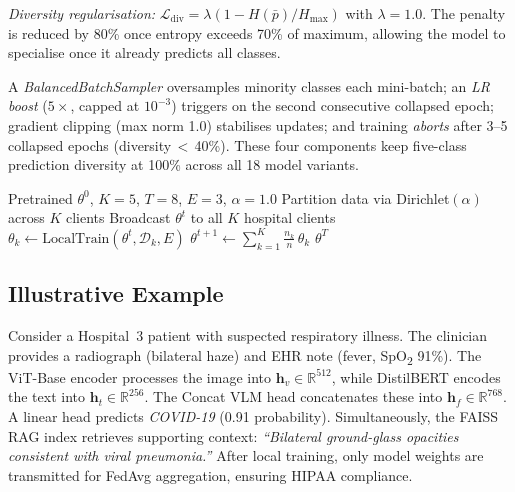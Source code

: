 \documentclass[conference]{IEEEtran}
\begin{document}
\textit{Diversity regularisation:}
$\mathcal{L}_{\text{div}}{=}\lambda(1{-}H(\bar{p})/H_{\max})$
with $\lambda{=}1.0$. The penalty is reduced by 80\% once entropy exceeds
70\% of maximum, allowing the model to specialise once it already
predicts all classes.

A \textit{BalancedBatchSampler} oversamples minority classes each
mini-batch; an \textit{LR boost} ($5{\times}$, capped at $10^{-3}$)
triggers on the second consecutive collapsed epoch; gradient clipping
(max norm 1.0) stabilises updates; and training \textit{aborts} after
3--5 collapsed epochs (diversity\,$<$\,40\%). These four components
keep five-class prediction diversity at 100\% across all 18 model
variants.

\begin{algorithm}[t]
\caption{MedFederate FedAvg}
\label{alg:fedavg}
\begin{algorithmic}[1]
\REQUIRE Pretrained $\theta^0$, $K{=}5$, $T{=}8$, $E{=}3$, $\alpha{=}1.0$
\STATE Partition data via Dirichlet$(\alpha)$ across $K$ clients
  \STATE Broadcast $\theta^t$ to all $K$ hospital clients
    \STATE $\theta_k \leftarrow \mathrm{LocalTrain}(\theta^t, \mathcal{D}_k, E)$
    \quad{}
  \ENDFOR
  \STATE $\theta^{t+1} \leftarrow \sum_{k=1}^{K}\frac{n_k}{n}\,\theta_k$
  \quad{}
\ENDFOR
\RETURN $\theta^T$
\end{algorithmic}
\end{algorithm}

\subsection{Illustrative Example}

Consider a Hospital~3 patient with suspected respiratory illness. The clinician
provides a radiograph (bilateral haze) and EHR note (fever,
SpO\textsubscript{2} 91\%). The ViT-Base encoder processes the image into
$\mathbf{h}_v\!\in\!\mathbb{R}^{512}$, while DistilBERT encodes the text into
$\mathbf{h}_t\!\in\!\mathbb{R}^{256}$. The Concat VLM head concatenates these
into $\mathbf{h}_f\!\in\!\mathbb{R}^{768}$. A linear head predicts
\textit{COVID-19} (0.91 probability). Simultaneously, the FAISS RAG index
retrieves supporting context: \textit{``Bilateral ground-glass opacities
consistent with viral pneumonia.''} After local training, only model weights
are transmitted for FedAvg aggregation, ensuring HIPAA compliance.
\end{document}
